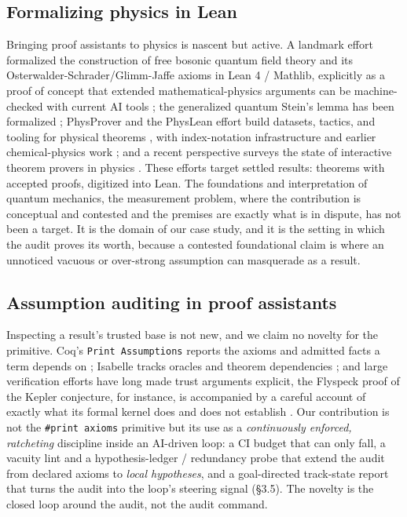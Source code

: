 \documentclass[11pt]{article}
\begin{document}
\subsection{Formalizing physics in Lean}

Bringing proof assistants to physics is nascent but active. A landmark effort formalized the
construction of free bosonic quantum field theory and its Osterwalder-Schrader/Glimm-Jaffe axioms
in Lean 4 / Mathlib, explicitly as a proof of concept that extended mathematical-physics arguments
can be machine-checked with current AI tools \cite{r24}; the generalized quantum Stein's lemma has been
formalized \cite{r25}; PhysProver and the PhysLean effort build datasets, tactics, and tooling for
physical theorems \cite{r26,r27}, with index-notation infrastructure \cite{r28} and earlier chemical-physics
work \cite{r29}; and a recent perspective surveys the state of interactive theorem provers in
physics \cite{r30}. These efforts target settled results: theorems with accepted proofs, digitized into
Lean. The foundations and interpretation of quantum mechanics, the measurement problem, where the
contribution is conceptual and contested and the premises are exactly what is in dispute, has not
been a target. It is the domain of our case study, and it is the setting in which the audit proves
its worth, because a contested foundational claim is where an unnoticed vacuous or over-strong
assumption can masquerade as a result.

\subsection{Assumption auditing in proof assistants}

Inspecting a result's trusted base is not new, and we claim no novelty for the primitive. Coq's
\texttt{Print Assumptions} reports the axioms and admitted facts a term depends on \cite{r50}; Isabelle tracks
oracles and theorem dependencies \cite{r51}; and large verification efforts have long made trust arguments
explicit, the Flyspeck proof of the Kepler conjecture, for instance, is accompanied by a careful
account of exactly what its formal kernel does and does not establish \cite{r52}. Our contribution is
not the \texttt{\#print axioms} primitive but its use as a \emph{continuously enforced, ratcheting} discipline
inside an AI-driven loop: a CI budget that can only fall, a vacuity lint and a hypothesis-ledger /
redundancy probe that extend the audit from declared axioms to \emph{local hypotheses}, and a
goal-directed track-state report that turns the audit into the loop's steering signal (§3.5). The
novelty is the closed loop around the audit, not the audit command.
\end{document}
